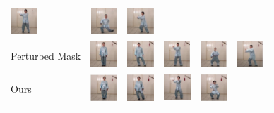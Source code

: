 \documentclass{article}
\begin{document}
\begin{table}[t]
\begin{center}
\begin{small}
\begin{sc}
\begin{tabular}{m{1.0cm}m{1.0cm}m{1.0cm}m{1.0cm}m{1.0cm}m{1.0cm}}
\includegraphics[width=1cm, height=1cm]{images/3_FOMM_3} &
\includegraphics[width=1cm, height=1cm]{images/3_FOMM_4} &
\includegraphics[width=1cm, height=1cm]{images/3_FOMM_5} \\
Perturbed Mask & \includegraphics[width=1cm,
height=1cm]{images/4_Perturbed_1} &
\includegraphics[width=1cm, height=1cm]{images/4_Perturbed_2} &
\includegraphics[width=1cm, height=1cm]{images/4_Perturbed_3} &
\includegraphics[width=1cm, height=1cm]{images/4_Perturbed_4} &
\includegraphics[width=1cm, height=1cm]{images/4_Perturbed_5} \\
Ours & \includegraphics[width=1cm, height=1cm]{images/5_Ours_1} &
\includegraphics[width=1cm, height=1cm]{images/5_Ours_2} &
\includegraphics[width=1cm, height=1cm]{images/5_Ours_3} &
\includegraphics[width=1cm, height=1cm]{images/5_Ours_4} &

\end{tabular}
\end{sc}
\end{small}
\end{center}
\end{table}
\end{document}
